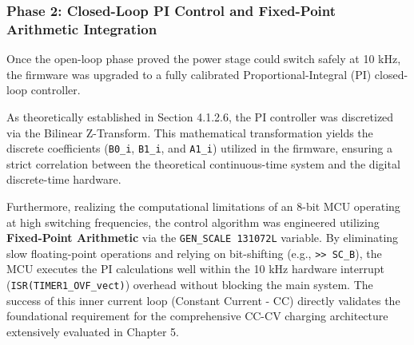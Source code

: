 \newpage

\subsubsection{Phase 2: Closed-Loop PI Control and Fixed-Point Arithmetic Integration}
Once the open-loop phase proved the power stage could switch safely at 10 kHz, the firmware was upgraded to a fully calibrated Proportional-Integral (PI) closed-loop controller. 

As theoretically established in Section 4.1.2.6, the PI controller was discretized via the Bilinear Z-Transform. This mathematical transformation yields the discrete coefficients (\texttt{B0\_i}, \texttt{B1\_i}, and \texttt{A1\_i}) utilized in the firmware, ensuring a strict correlation between the theoretical continuous-time system and the digital discrete-time hardware.

Furthermore, realizing the computational limitations of an 8-bit MCU operating at high switching frequencies, the control algorithm was engineered utilizing \textbf{Fixed-Point Arithmetic} via the \texttt{GEN\_SCALE 131072L} variable. By eliminating slow floating-point operations and relying on bit-shifting (e.g., \texttt{>> SC\_B}), the MCU executes the PI calculations well within the 10 kHz hardware interrupt (\texttt{ISR(TIMER1\_OVF\_vect)}) overhead without blocking the main system. The success of this inner current loop (Constant Current - CC) directly validates the foundational requirement for the comprehensive CC-CV charging architecture extensively evaluated in Chapter 5.

